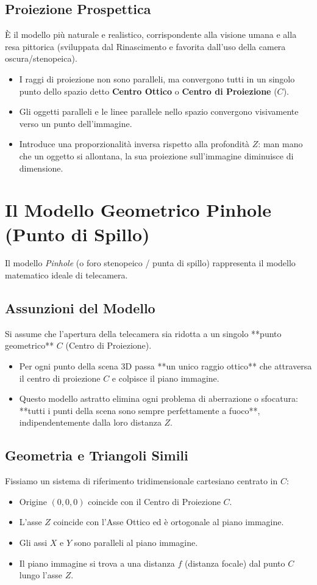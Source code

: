 \subsection{Proiezione Prospettica}
È il modello più naturale e realistico, corrispondente alla visione umana e alla resa pittorica (sviluppata dal Rinascimento e favorita dall'uso della camera oscura/stenopeica).
\begin{itemize}
    \item I raggi di proiezione non sono paralleli, ma convergono tutti in un singolo punto dello spazio detto \textbf{Centro Ottico} o \textbf{Centro di Proiezione} ($C$).
    \item Gli oggetti paralleli e le linee parallele nello spazio convergono visivamente verso un punto dell'immagine.
    \item Introduce una proporzionalità inversa rispetto alla profondità $Z$: man mano che un oggetto si allontana, la sua proiezione sull'immagine diminuisce di dimensione.
\end{itemize}

\section{Il Modello Geometrico Pinhole (Punto di Spillo)}
Il modello \textit{Pinhole} (o foro stenopeico / punta di spillo) rappresenta il modello matematico ideale di telecamera.

\subsection{Assunzioni del Modello}
Si assume che l'apertura della telecamera sia ridotta a un singolo **punto geometrico** $C$ (Centro di Proiezione).
\begin{itemize}
    \item Per ogni punto della scena $3\text{D}$ passa **un unico raggio ottico** che attraversa il centro di proiezione $C$ e colpisce il piano immagine.
    \item Questo modello astratto elimina ogni problema di aberrazione o sfocatura: **tutti i punti della scena sono sempre perfettamente a fuoco**, indipendentemente dalla loro distanza $Z$.
\end{itemize}

\subsection{Geometria e Triangoli Simili}
Fissiamo un sistema di riferimento tridimensionale cartesiano centrato in $C$:
\begin{itemize}
    \item Origine $(0,0,0)$ coincide con il Centro di Proiezione $C$.
    \item L'asse $Z$ coincide con l'Asse Ottico ed è ortogonale al piano immagine.
    \item Gli assi $X$ e $Y$ sono paralleli al piano immagine.
    \item Il piano immagine si trova a una distanza $f$ (distanza focale) dal punto $C$ lungo l'asse $Z$.
\end{itemize}

